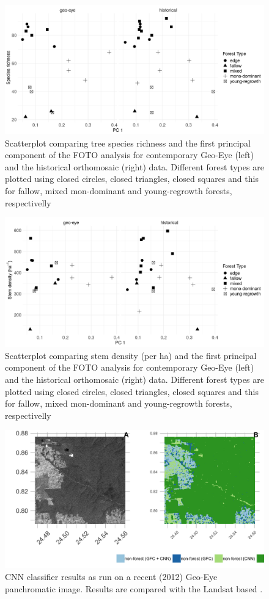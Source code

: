 \documentclass[landscape]{article}
\begin{document}
\begin{figure}
\includegraphics[width=0.75\linewidth]{./figures/foto_pc1_diversity} \caption{Scatterplot comparing tree species richness and the first principal component of the FOTO analysis for contemporary Geo-Eye (left) and the historical orthomosaic (right) data. Different forest types are plotted using closed circles, closed triangles, closed squares and this for fallow, mixed mon-dominant and young-regrowth forests, respectivelly}\label{fig:unnamed-chunk-7}
\end{figure}

\begin{figure}
\includegraphics[width=0.75\linewidth]{./figures/foto_pc1_stems} \caption{Scatterplot comparing stem density (per ha) and the first principal component of the FOTO analysis for contemporary Geo-Eye (left) and the historical orthomosaic (right) data. Different forest types are plotted using closed circles, closed triangles, closed squares and this for fallow, mixed mon-dominant and young-regrowth forests, respectivelly}\label{fig:unnamed-chunk-8}
\end{figure}

\pagebreak

\begin{figure}
\includegraphics[width=31.25in,height=0.75\textheight]{./figures/visual_comparison_classifiers} \caption{CNN classifier results as run on a recent (2012) Geo-Eye panchromatic image. Results are compared with the Landsat based .}\label{fig:unnamed-chunk-9}
\end{figure}
\end{document}
